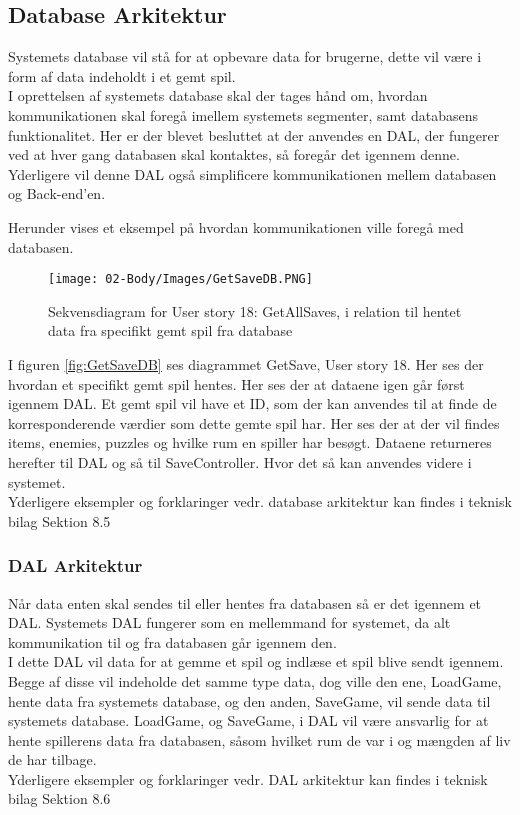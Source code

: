 \subsection{Database Arkitektur}
Systemets database vil stå for at opbevare data for brugerne, dette vil være i form af data indeholdt i et gemt spil.\\
I oprettelsen af systemets database skal der tages hånd om, hvordan kommunikationen skal foregå imellem systemets segmenter, samt databasens funktionalitet. Her er der blevet besluttet at der anvendes en DAL, der fungerer ved at hver gang databasen skal kontaktes, så foregår det igennem denne. Yderligere vil denne DAL også simplificere kommunikationen mellem databasen og Back-end'en. 

\noindent Herunder vises et eksempel på hvordan kommunikationen ville foregå med databasen.

\begin{figure}[H]
\centering
\texttt{[image: 02-Body/Images/GetSaveDB.PNG]}
\caption{Sekvensdiagram for User story 18: GetAllSaves, i relation til hentet data fra specifikt gemt spil fra database}
\label{fig:GetSaveDB}
\end{figure}

\noindent I figuren \autoref{fig:GetSaveDB} ses diagrammet GetSave, User story 18. Her ses der hvordan et specifikt gemt spil hentes. Her ses der at dataene igen går først igennem DAL. Et gemt spil vil have et ID, som der kan anvendes til at finde de korresponderende værdier som dette gemte spil har. Her ses der at der vil findes items, enemies, puzzles og hvilke rum en spiller har besøgt. Dataene returneres herefter til DAL og så til SaveController. Hvor det så kan anvendes videre i systemet.\\

\noindent Yderligere eksempler og forklaringer vedr. database arkitektur kan findes i teknisk bilag Sektion 8.5

\subsubsection{DAL Arkitektur}
Når data enten skal sendes til eller hentes fra databasen så er det igennem et DAL. Systemets DAL fungerer som en mellemmand for systemet, da alt kommunikation til og fra databasen går igennem den.\\
\noindent I dette DAL vil data for at gemme et spil og indlæse et spil blive sendt igennem. Begge af disse vil indeholde det samme type data, dog ville den ene, LoadGame, hente data fra systemets database, og den anden, SaveGame, vil sende data til systemets database. 
LoadGame, og SaveGame, i DAL vil være ansvarlig for at hente spillerens data fra databasen, såsom hvilket rum de var i og mængden af liv de har tilbage.\\

\noindent Yderligere eksempler og forklaringer vedr. DAL arkitektur kan findes i teknisk bilag Sektion 8.6